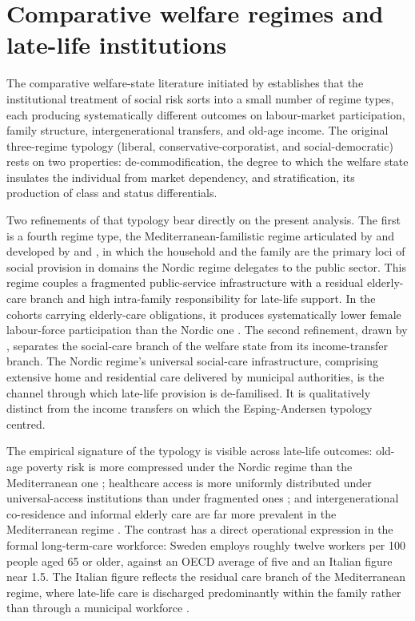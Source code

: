 \section{Comparative welfare regimes and late-life institutions}
\label{sec:ch2-welfare-regimes}

The comparative welfare-state literature initiated by \citet{espingandersen1990} establishes that the institutional treatment of social risk sorts into a small number of regime types, each producing systematically different outcomes on labour-market participation, family structure, intergenerational transfers, and old-age income. The original three-regime typology (liberal, conservative-corporatist, and social-democratic) rests on two properties: de-commodification, the degree to which the welfare state insulates the individual from market dependency, and stratification, its production of class and status differentials.

Two refinements of that typology bear directly on the present analysis. The first is a fourth regime type, the Mediterranean-familistic regime articulated by \citet{ferrera1996} and developed by \citet{saraceno2010} and \citet{naldini2008}, in which the household and the family are the primary loci of social provision in domains the Nordic regime delegates to the public sector. This regime couples a fragmented public-service infrastructure with a residual elderly-care branch and high intra-family responsibility for late-life support. In the cohorts carrying elderly-care obligations, it produces systematically lower female labour-force participation than the Nordic one \citep{bettio2004}. The second refinement, drawn by \citet{anttonen1996}, separates the social-care branch of the welfare state from its income-transfer branch. The Nordic regime's universal social-care infrastructure, comprising extensive home and residential care delivered by municipal authorities, is the channel through which late-life provision is de-familised. It is qualitatively distinct from the income transfers on which the Esping-Andersen typology centred.

The empirical signature of the typology is visible across late-life outcomes: old-age poverty risk is more compressed under the Nordic regime than the Mediterranean one \citep{ferrera1996}; healthcare access is more uniformly distributed under universal-access institutions than under fragmented ones \citep{bambra2007}; and intergenerational co-residence and informal elderly care are far more prevalent in the Mediterranean regime \citep{saraceno2010}. The contrast has a direct operational expression in the formal long-term-care workforce: Sweden employs roughly twelve workers per 100 people aged 65 or older, against an OECD average of five and an Italian figure near 1.5. The Italian figure reflects the residual care branch of the Mediterranean regime, where late-life care is discharged predominantly within the family rather than through a municipal workforce \citep{oecd2023}.

